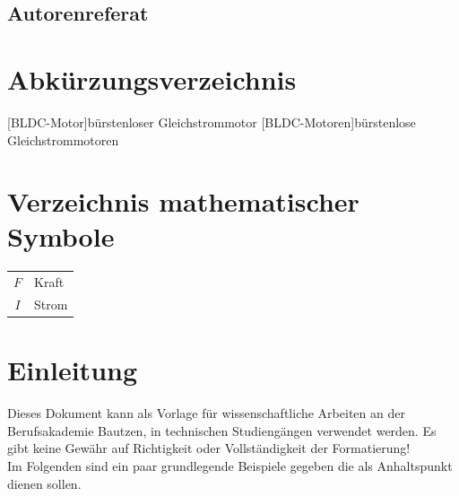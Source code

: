 \documentclass[
	12pt, 
	a4paper, 
	listof=entryprefix,
	captions=tableheading
	]{scrartcl}
\renewcommand{\equationautorefname}{}						%
\begin{document}
\renewcommand\tablename{TABELLE}							%
\renewcommand\thetable{\Roman{table}}						%
\renewcommand\figurename{Abb.}								%
\newcommand{\autoeqref}[1]{\hyperref[#1]{\equationautorefname~(\ref*{#1})}} %


\makeatletter
	\renewcommand\@dotsep{10000}
\makeatother

\clearpairofpagestyles
\begin{flushleft}
\section*{Autorenreferat}
\end{flushleft}
\newpage
{}
\tableofcontents
\newpage

\section*{Abkürzungsverzeichnis}
\begin{acronym}
[BLDC-Motor]{bürstenloser Gleichstrommotor}
[BLDC-Motoren]{bürstenlose Gleichstrommotoren}
\end{acronym}
\newpage

\section*{Verzeichnis mathematischer Symbole}
\begin{longtable}{cp{}}
  $F$ & Kraft\\
  $I$ & Strom
\end{longtable}
\setcounter{table}{0}
\newpage

\listoftables
\newpage

\listoffigures
\newpage
\chead{\pagemark}
\thispagestyle{empty}
\section{Einleitung}
Dieses Dokument kann als Vorlage für wissenschaftliche Arbeiten an der Berufsakademie Bautzen, in technischen Studiengängen verwendet werden. Es gibt keine Gewähr auf Richtigkeit oder Vollständigkeit der Formatierung!\\
Im Folgenden sind ein paar grundlegende Beispiele gegeben die als Anhaltspunkt dienen sollen.
\end{document}
